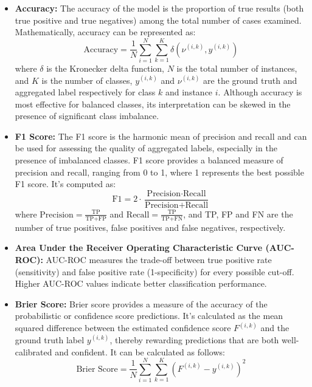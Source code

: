 \begin{itemize}
    \item \textbf{Accuracy:} The accuracy of the model is the proportion of true results (both true positive and true negatives) among the total number of cases examined. Mathematically, accuracy can be represented as:
    \begin{equation}
        \text{Accuracy}= \frac{1}{N} \sum_{i=1}^{N} \sum_{k=1}^{K} \delta\left(\nu^{(i,k)}, y^{(i,k)}\right)
    \end{equation}
    where $\delta$ is the Kronecker delta function, $N$ is the total number of instances, and $K$ is the number of classes, $y^{(i,k)}$ and $\nu^{(i,k)}$ are the ground truth and aggregated label respectively for class $k$ and instance $i$. Although accuracy is most effective for balanced classes, its interpretation can be skewed in the presence of significant class imbalance.

    \item \textbf{F1 Score:} The F1 score is the harmonic mean of precision and recall and can be used for assessing the quality of aggregated labels, especially in the presence of imbalanced classes. F1 score provides a balanced measure of precision and recall, ranging from 0 to 1, where 1 represents the best possible F1 score. It's computed as:
    \begin{equation}
        \text{F1} = 2 \cdot \frac{\text{Precision} \cdot \text{Recall}}{\text{Precision} + \text{Recall}}
    \end{equation}
    where $\text{Precision} = \frac{\text{TP}}{\text{TP+FP}}$ and $\text{Recall} = \frac{\text{TP}}{\text{TP+FN}}$, and TP, FP and FN are the number of true positives, false positives and false negatives, respectively.

    \item \textbf{Area Under the Receiver Operating Characteristic Curve (AUC-ROC):} AUC-ROC measures the trade-off between true positive rate (sensitivity) and false positive rate (1-specificity) for every possible cut-off. Higher AUC-ROC values indicate better classification performance.

    \item \textbf{Brier Score:} Brier score provides a measure of the accuracy of the probabilistic or confidence score predictions. It's calculated as the mean squared difference between the estimated confidence score $F^{(i,k)}$ and the ground truth label $y^{(i,k)}$, thereby rewarding predictions that are both well-calibrated and confident. It can be calculated as follows:
    \begin{equation}
        \text{Brier Score} = \frac{1}{N} \sum_{i=1}^{N} \sum_{k=1}^{K} {\left(F^{(i,k)} - y^{(i,k)}\right)}^2
    \end{equation}


\end{itemize}
